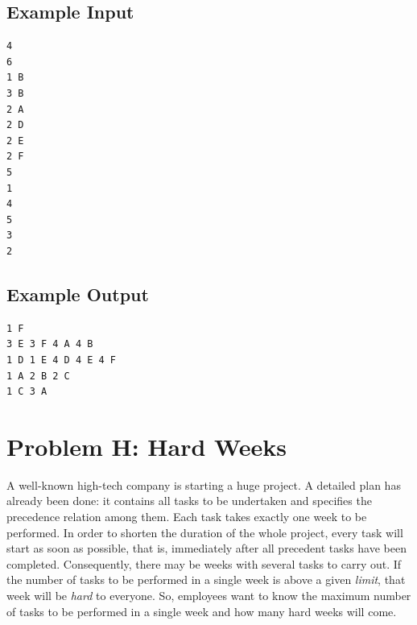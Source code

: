 \documentclass[11pt]{report}
\begin{document}
\subsection*{Example Input}

\begin{verbatim}
4
6
1 B
3 B
2 A
2 D
2 E
2 F
5
1
4
5
3
2
\end{verbatim}

\subsection*{Example Output}

\begin{verbatim}
1 F
3 E 3 F 4 A 4 B
1 D 1 E 4 D 4 E 4 F
1 A 2 B 2 C
1 C 3 A
\end{verbatim}

\clearpage

\section*{Problem H: Hard Weeks}

A well-known high-tech company is starting a huge project.
A detailed plan has already been done:
it contains all tasks to be undertaken and
specifies the precedence relation among them.
Each task takes exactly one week to be performed.
In order to shorten the duration of the whole project,
every task will start as soon as possible,
that is,
immediately after all precedent tasks have been completed.
Consequently, there may be weeks with several tasks to carry out.
If the number of tasks to be performed in a single week is
above a given \textit{limit},
that week will be \textit{hard} to everyone.
So, employees want to know
the maximum number of tasks to be performed in a single week and
how many hard weeks will come.
\end{document}
